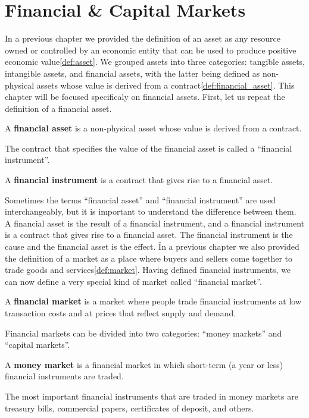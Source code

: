 \section{Financial \& Capital Markets}

In a previous chapter we provided the definition of an asset as any resource owned or controlled by an economic
entity that can be used to produce positive economic value\ref{def:asset}. We grouped assets into three categories:
tangible assets, intangible assets, and financial assets, with the latter being defined as non-physical assets whose
value is derived from a contract\ref{def:financial_asset}. This chapter will be focused specificaly on financial assets.
First, let us repeat the definition of a financial asset.

A \textbf{financial asset} is a non-physical asset whose value is derived from a contract.
\ed

The contract that specifies the value of the financial asset is called a ``financial instrument''.

A \textbf{financial instrument} is a contract that gives rise to a financial asset.
\ed

Sometimes the terms ``financial asset'' and ``financial instrument'' are used interchangeably, but it is important to
understand the difference between them. A financial asset is the result of a financial instrument, and a financial
instrument is a contract that gives rise to a financial asset. The financial instrument is the cause and the financial
asset is the effect. \v

In a previous chapter we also provided the definition of a market as a place where buyers and sellers come together to
trade goods and services\ref{def:market}. Having defined financial instruments, we can now define a very special kind
of market called ``financial market''.

A \textbf{financial market} is a market where people trade financial instruments at low transaction costs and at prices
that reflect supply and demand.
\ed

Financial markets can be divided into two categories: ``money markets'' and ``capital markets''.

A \textbf{money market} is a financial market in which short-term (a year or less) financial instruments are traded.
\ed

The most important financial instruments that are traded in money markets are treasury bills, commercial papers,
certificates of deposit, and others.


